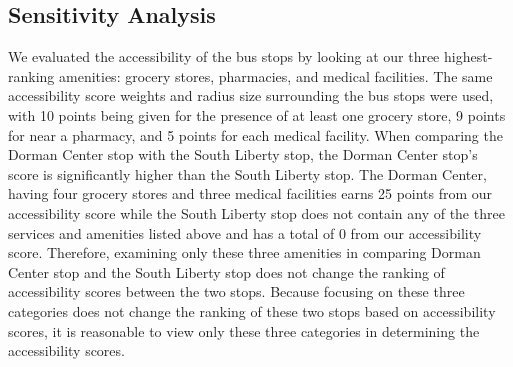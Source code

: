 \subsection{Sensitivity Analysis}

We evaluated the accessibility of the bus stops by looking at our three highest-ranking amenities:  grocery stores, pharmacies, and medical facilities.  The same accessibility score weights and radius size surrounding the bus stops were used, with 10 points being given for the presence of at least one grocery store, 9 points for near a pharmacy, and 5 points for each medical facility.  When comparing the Dorman Center stop with the South Liberty stop, the Dorman Center stop’s score is significantly higher than the South Liberty stop.  The Dorman Center, having four grocery stores and three medical facilities earns 25 points from our accessibility score while the South Liberty stop does not contain any of the three services and amenities listed above and has a total of 0 from our accessibility score.  Therefore, examining only these three amenities in comparing Dorman Center stop and the South Liberty stop does not change the ranking of accessibility scores between the two stops.  Because focusing on these three categories does not change the ranking of these two stops based on accessibility scores, it is reasonable to view only these three categories in determining the accessibility scores.  
